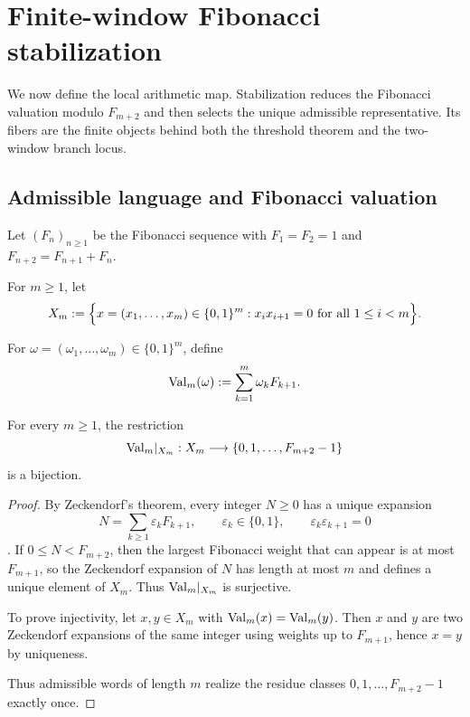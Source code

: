 \section{Finite-window Fibonacci stabilization}\label{sec:stabilization}

We now define the local arithmetic map. Stabilization reduces the Fibonacci valuation modulo $F_{m+2}$ and then selects the unique admissible representative. Its fibers are the finite objects behind both the threshold theorem and the two-window branch locus.

\subsection{Admissible language and Fibonacci valuation}\label{sec:stab:golden}

Let $(F_n)_{n\ge 1}$ be the Fibonacci sequence with $F_1=F_2=1$ and $F_{n+2}=F_{n+1}+F_n$.

\begin{definition}\label{def:Xm}
For $m\ge 1$, let
\[
X_m := \Bigl\{x=(x_1,\dots,x_m)\in\{0,1\}^m : x_i x_{i+1}=0\ \text{for all }1\le i<m\Bigr\}.
\]
\end{definition}

\begin{definition}\label{def:valuation}
For $\omega=(\omega_1,\ldots,\omega_m)\in\{0,1\}^m$, define
\[
\mathrm{Val}_m(\omega):=\sum_{k=1}^m \omega_k F_{k+1}.
\]
\end{definition}

\begin{proposition}\label{prop:finite-window-range}
For every $m\ge 1$, the restriction
\[
\mathrm{Val}_m|_{X_m}:X_m\longrightarrow \{0,1,\dots,F_{m+2}-1\}
\]
is a bijection.
\end{proposition}

\begin{proof}
By Zeckendorf's theorem, every integer $N\ge 0$ has a unique expansion
\[
N=\sum_{k\ge 1}\varepsilon_k F_{k+1},\qquad \varepsilon_k\in\{0,1\},\qquad \varepsilon_k\varepsilon_{k+1}=0
\]
\cite{Zeckendorf1972,Lothaire2002}. If $0\le N < F_{m+2}$, then the largest Fibonacci weight that can appear is at most $F_{m+1}$, so the Zeckendorf expansion of $N$ has length at most $m$ and defines a unique element of $X_m$. Thus $\mathrm{Val}_m|_{X_m}$ is surjective.

To prove injectivity, let $x,y\in X_m$ with $\mathrm{Val}_m(x)=\mathrm{Val}_m(y)$. Then $x$ and $y$ are two Zeckendorf expansions of the same integer using weights up to $F_{m+1}$, hence $x=y$ by uniqueness.

Thus admissible words of length $m$ realize the residue classes $0,1,\dots,F_{m+2}-1$ exactly once.
\end{proof}

